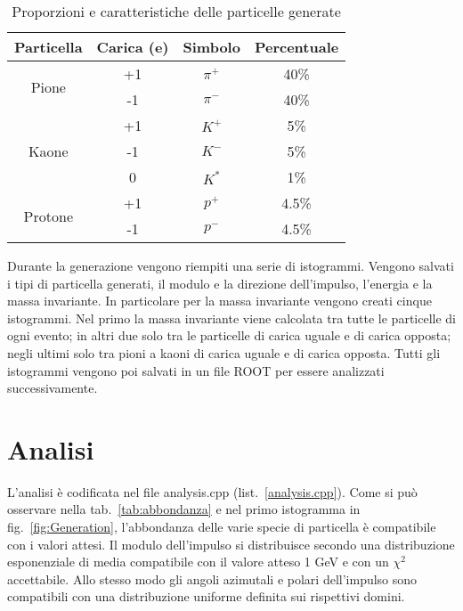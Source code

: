 \documentclass[a4paper,10pt]{article}
\begin{document}
\begin{table*}
  \caption{Proporzioni e caratteristiche delle particelle generate}
  \label{tab:proporzioni}
  \centering
  \begin{tabular}{cccc}
    \toprule
    Particella               & Carica (e) & Simbolo & Percentuale \\
    \midrule
    \multirow{2}{*}{Pione}   & +1         & $\pi^+$ & 40\%        \\
                             & -1         & $\pi^-$ & 40\%        \\
    \midrule
    \multirow{3}{*}{Kaone}   & +1         & $K^+$   & 5\%         \\
                             & -1         & $K^-$   & 5\%         \\
                             & 0          & $K^*$   & 1\%         \\
    \midrule
    \multirow{2}{*}{Protone} & +1         & $p^+$   & 4.5\%       \\
                             & -1         & $p^-$   & 4.5\%       \\
    \bottomrule
  \end{tabular}
\end{table*}

Durante la generazione vengono riempiti una serie di istogrammi. Vengono salvati i tipi di particella generati, il modulo e la direzione dell'impulso, l'energia e la massa invariante. In particolare per la massa invariante vengono creati cinque istogrammi. Nel primo la massa invariante viene calcolata tra tutte le particelle di ogni evento; in altri due solo tra le particelle di carica uguale e di carica opposta; negli ultimi solo tra pioni a kaoni di carica uguale e di carica opposta. Tutti gli istogrammi vengono poi salvati in un file ROOT per essere analizzati successivamente.

\section{Analisi}
L'analisi è codificata nel file analysis.cpp (list.~\ref{analysis.cpp}). Come si può osservare nella tab.~\ref{tab:abbondanza} e nel primo istogramma in fig.~\ref{fig:Generation}, l'abbondanza delle varie specie di particella è compatibile con i valori attesi. Il modulo dell'impulso si distribuisce secondo una distribuzione esponenziale di media compatibile con il valore atteso 1 GeV e con un $\chi^2$ accettabile. Allo stesso modo gli angoli azimutali e polari dell'impulso sono compatibili con una distribuzione uniforme definita sui rispettivi domini.
\end{document}
